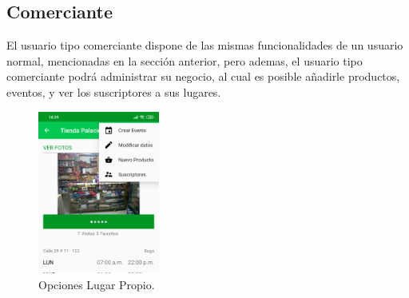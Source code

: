\documentclass[12pt,letterpaper,openany]{book}
\begin{document}
\subsection{Comerciante}
El usuario tipo comerciante dispone de las mismas funcionalidades de un usuario normal, mencionadas en la sección anterior, pero ademas, el usuario tipo comerciante podrá administrar su negocio, al cual es posible añadirle productos, eventos, y ver los suscriptores a sus lugares.\\
\begin{figure}[H]
\begin{center}
\includegraphics[width=4cm]{./imagenes/7}
\caption{Opciones Lugar Propio.}
\end{center}
\end{figure}
\end{document}
